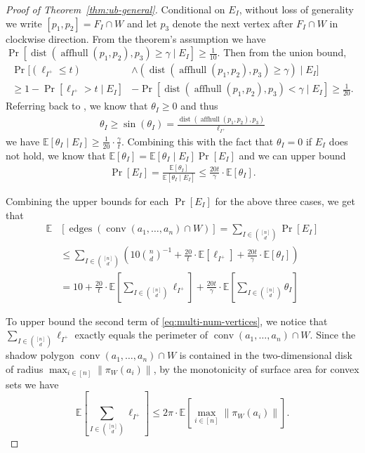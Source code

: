 \documentclass{theoretics}
\newcommand{\E}{\mathbb E}
\newcommand{\aff}{\operatorname{affhull}}
\newcommand{\conv}{\operatorname{conv}}
\newcommand{\edges}{\operatorname{edges}}
\newcommand{\dist}{\operatorname{dist}}
\begin{document}
\begin{proof}[Proof of Theorem~\ref{thm:ub-general}]
    Conditional on $E_I$, without loss of generality we write $[p_1, p_2] = F_I \cap W$ and let $p_3$ denote the next vertex after $F_I \cap W$ in clockwise direction.
    From the theorem's assumption we have
    $\Pr[\dist(\aff(p_1, p_2), p_3) \geq \gamma \mid  E_I] \geq \frac{1}{10}$.
    Then from the union bound,
    \begin{align*}
    \Pr[(\ell_{I^+} \leq t) &\wedge (\dist(\aff(p_1, p_2), p_3) \geq \gamma) \mid E_I]\\
    \geq 1 - \Pr[\ell_{I^+} > t \mid E_I] &- \Pr[\dist(\aff(p_1, p_2), p_3) < \gamma \mid E_I]
    \geq \frac{1}{20}.
    \end{align*}
    Referring back to , we know that $\theta_I \geq 0$ and thus
    \begin{align*}
        \theta_I \geq \sin(\theta_I) =  \frac{\dist(\aff(p_1, p_2), p_3)}{\ell_{I^+}}
    \end{align*}
    we have $\E[\theta_I \mid E_I] \geq \frac{1}{20} \cdot \frac{\gamma}{t}$.
    Combining this with the fact that  $\theta_{I}=0$ if $E_{I}$ does not hold, we know that
    $\E[\theta_I] = \E[\theta_I \mid E_I] \Pr[E_I]$ and we can upper bound
    \begin{align*}
        \Pr[E_I] = \frac{\E[\theta_I ]}{\E[\theta_I \mid E_I]} 
        \leq \frac{20 t}{\gamma} \cdot \E[\theta_I].
    \end{align*}

  
    Combining the upper bounds for each $\Pr[E_I]$ for the above three cases, we get that
    \begin{align}\label{eq:multi-num-vertices}
    \E&\left[ \edges\left(\conv(a_1, \ldots, a_n) \cap W \right) \right] = \sum_{I \in \binom{[n]}{d}} \Pr[E_I] \nonumber \\
    &\leq  \sum_{I \in \binom{[n]}{d}} \left( 10 \binom n d ^{-1} + \frac{20}{t} \cdot \E[\ell_{I^+}]
    + \frac{20t}{\gamma} \cdot \E[\theta_I]  \right) \nonumber \\
    &=  10 + \frac{20}{t} \cdot \E[\sum_{I \in \binom{[n]}{d}} \ell_{I^+}]
        + \frac{20 t}{\gamma}
        \cdot \E[\sum_{I \in \binom{[n]}{d}}\theta_I]
    \end{align}
    
    To upper bound the second term of \eqref{eq:multi-num-vertices},
    we notice that $\sum_{I \in \binom{[n]}{d}} \ell_{I^+}$ exactly equals
        the perimeter of $\conv(a_1,\dots,a_n) \cap W$. 
    Since the shadow polygon
        $\conv(a_1, \ldots, a_n)\cap W$ is contained in the two-dimensional disk of radius $\max_{i\in [n]} \|\pi_{W}(a_i)\|$,
    by the monotonicity of surface area for convex sets we have
    \[
        \E[\sum_{I \in \binom{[n]}{d}} \ell_{I^+}]
        \leq 2\pi \cdot \E[\max_{i\in [n]} \|\pi_W(a_i)\|].
    \]
        

\end{proof}
\end{document}
